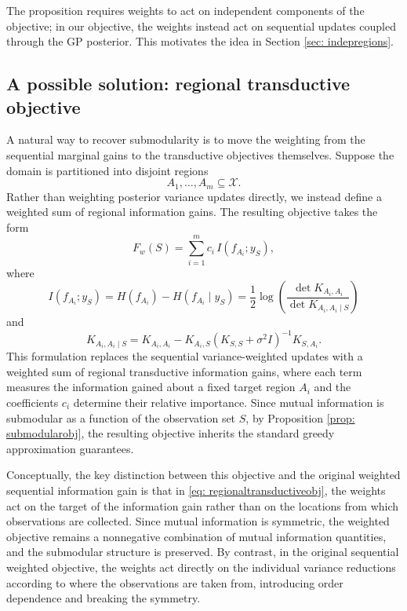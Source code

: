 The proposition requires weights to act on independent components of the objective; in our objective, the weights instead act on sequential updates coupled through the GP posterior. This motivates the idea in Section \ref{sec: indepregions}.

\subsection{A possible solution: regional transductive objective} \label{sec: transobjective}

A natural way to recover submodularity is to move the weighting from the sequential marginal gains to the transductive objectives themselves. Suppose the domain is partitioned into disjoint regions
\begin{equation*}
A_1,\dots,A_m \subseteq \mathcal{X}.
\end{equation*}
Rather than weighting posterior variance updates directly, we instead define a weighted sum of regional information gains. The resulting objective takes the form
\begin{equation} \label{eq: regionaltransductiveobj}
F_w(S)
=
\sum_{i=1}^m
c_i\, I(f_{A_i};y_S),
\end{equation}
where
\begin{equation*}
I(f_{A_i};y_S)
=
H(f_{A_i})
-
H(f_{A_i}\mid y_S)
=
\frac12
\log\!\left(
\frac{\det K_{A_i,A_i}}
{\det K_{A_i,A_i\mid S}}
\right)
\end{equation*}
and
\begin{equation*}
K_{A_i,A_i\mid S}
=
K_{A_i,A_i}
-
K_{A_i,S}
\left(
K_{S,S}+\sigma^2 I
\right)^{-1}
K_{S,A_i}.
\end{equation*}
This formulation replaces the sequential variance-weighted updates with a weighted sum of regional transductive information gains, where each term measures the information gained about a fixed target region $A_i$ and the coefficients $c_i$ determine their relative importance. Since mutual information is submodular as a function of the observation set $S$, by Proposition \ref{prop: submodularobj}, the resulting objective inherits the standard greedy approximation guarantees. 

Conceptually, the key distinction between this objective and the original weighted sequential information gain is that in \eqref{eq: regionaltransductiveobj}, the weights act on the target of the information gain rather than on the locations from which observations are collected. Since mutual information is symmetric, the weighted objective remains a nonnegative combination of mutual information quantities, and the submodular structure is preserved. By contrast, in the original sequential weighted objective, the weights act directly on the individual variance reductions according to where the observations are taken from, introducing order dependence and breaking the symmetry.


